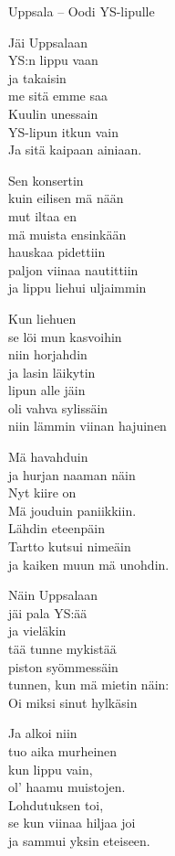 \begin{song}{Uppsala – Oodi YS-lipulle}


    Jäi Uppsalaan\\
    YS:n lippu vaan\\
    ja takaisin\\
    me sitä emme saa\\
    Kuulin unessain\\
    YS-lipun itkun vain\\
    Ja sitä kaipaan ainiaan.
    
    Sen konsertin\\
    kuin eilisen mä nään\\
    mut iltaa en\\
    mä muista ensinkään\\
    hauskaa pidettiin\\
    paljon viinaa nautittiin\\
    ja lippu liehui uljaimmin

    Kun liehuen\\
    se löi mun kasvoihin\\
    niin horjahdin\\
    ja lasin läikytin\\
    lipun alle jäin\\
    oli vahva sylissäin\\
    niin lämmin viinan hajuinen

    Mä havahduin\\
    ja hurjan naaman näin\\
    Nyt kiire on\\
    Mä jouduin paniikkiin.\\
    Lähdin eteenpäin\\
    Tartto kutsui nimeäin\\
    ja kaiken muun mä unohdin.

    Näin Uppsalaan\\
    jäi pala YS:ää\\
    ja vieläkin\\
    tää tunne mykistää\\
    piston syömmessäin\\
    tunnen, kun mä mietin näin:\\
    Oi miksi sinut hylkäsin

    Ja alkoi niin\\
    tuo aika murheinen\\
    kun lippu vain,\\
    ol’ haamu muistojen.\\
    Lohdutuksen toi,\\
    se kun viinaa hiljaa joi\\
    ja sammui yksin eteiseen.


\end{song}
